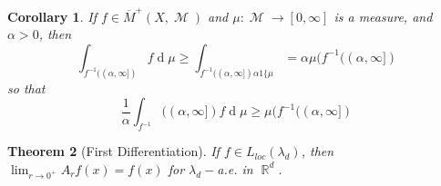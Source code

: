 \documentclass[12pt, a4paper]{memoir}
\DeclareMathOperator{\R}{{\mathbb{R}}}
\newtheorem{theorem}{Theorem}[section]
\newtheorem{corollary}[theorem]{Corollary}
\theoremstyle{nonumberplain}
\DeclareMathOperator{\M}{\mathcal{M}}
\renewcommand{\d}[1]{\ensuremath{\operatorname{d}\!{#1}}} %
\begin{document}
\begin{corollary}
    If $f\in\overline{M}^+(X,\M)$ and $\mu:\M\to[0,\infty]$ is a measure, and $\alpha>0$, then
    \begin{equation*}
        \int_{f^{-1}((\alpha,\infty])}f\d{\mu}\geq\int_{f^{-1}((\alpha,\infty])\alpha 1\{\mu}=\alpha\mu(f^{-1}((\alpha,\infty])
    \end{equation*}
    so that
    \begin{equation*}
        \frac{1}{\alpha}\int_{f^{-1}}((\alpha,\infty])f\d{\mu}\geq\mu(f^{-1}((\alpha,\infty])
    \end{equation*}
\end{corollary}
\begin{theorem}[First Differentiation]
    If $f\in L_{loc}(\lambda_d)$, then $\lim_{r\to 0^+}A_rf(x)=f(x)$ for $\lambda_d-$a.e. in $\R^d$.
\end{theorem}
\end{document}

